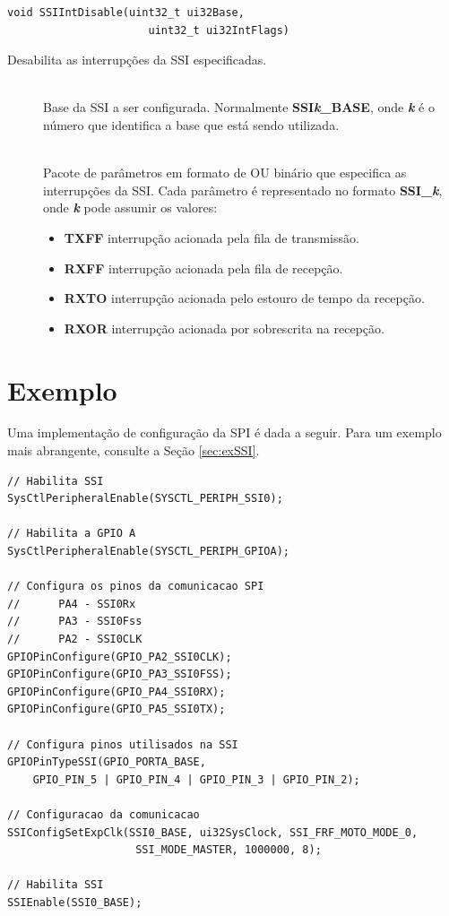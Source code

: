 \begin{lstlisting}[style=funcao]
	void SSIIntDisable(uint32_t ui32Base,
					  uint32_t ui32IntFlags)
\end{lstlisting}

Desabilita as interrupções da SSI especificadas.

\begin{description}
	\item []\hfill \\
	Base da SSI a ser configurada. Normalmente \textbf{SSI\emph{k}\_BASE}, onde \textbf{\emph{k}} é o número que identifica a base que está sendo utilizada.
	
	\item []\hfill \\
	Pacote de parâmetros em formato de OU binário que especifica as interrupções da SSI. Cada parâmetro é representado no formato \textbf{SSI\_\emph{k}}, onde \textbf{\emph{k}} pode assumir os valores:
	\begin{itemize}
		\item \textbf{TXFF} interrupção acionada pela fila de transmissão.
		\item \textbf{RXFF} interrupção acionada pela fila de recepção.
		\item \textbf{RXTO} interrupção acionada pelo estouro de tempo da recepção.
		\item \textbf{RXOR} interrupção acionada por sobrescrita na recepção.
	\end{itemize}
\end{description}

\section{Exemplo}

Uma implementação de configuração da SPI é dada a seguir. Para um exemplo mais abrangente, consulte a Seção \ref{sec:exSSI}.

\begin{lstlisting}[style=citacao]
// Habilita SSI
SysCtlPeripheralEnable(SYSCTL_PERIPH_SSI0);

// Habilita a GPIO A
SysCtlPeripheralEnable(SYSCTL_PERIPH_GPIOA);

// Configura os pinos da comunicacao SPI
//      PA4 - SSI0Rx
//      PA3 - SSI0Fss
//      PA2 - SSI0CLK
GPIOPinConfigure(GPIO_PA2_SSI0CLK);
GPIOPinConfigure(GPIO_PA3_SSI0FSS);
GPIOPinConfigure(GPIO_PA4_SSI0RX);
GPIOPinConfigure(GPIO_PA5_SSI0TX);

// Configura pinos utilisados na SSI
GPIOPinTypeSSI(GPIO_PORTA_BASE,
	GPIO_PIN_5 | GPIO_PIN_4 | GPIO_PIN_3 | GPIO_PIN_2);

// Configuracao da comunicacao
SSIConfigSetExpClk(SSI0_BASE, ui32SysClock, SSI_FRF_MOTO_MODE_0,
					SSI_MODE_MASTER, 1000000, 8);

// Habilita SSI
SSIEnable(SSI0_BASE);
\end{lstlisting}

